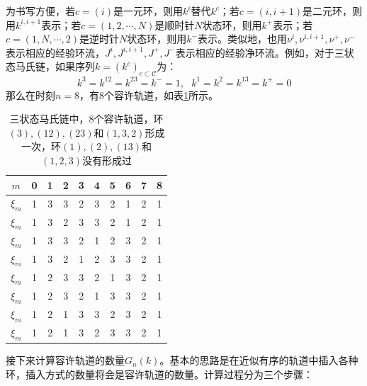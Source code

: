 为书写方便，若$c=(i)$是一元环，则用$k^i$替代$k^c$；若$c=(i,i+1)$是二元环，则用$k^{i,i+1}$表示；若$c=(1,2,\cdots,N)$是顺时针$N$状态环，则用$k^{+}$表示；若$c=(1,N,\cdots,2)$是逆时针$N$状态环，则用$k^{-}$表示。类似地，也用$\nu^i, \nu^{i,i+1}, \nu^+, \nu^-$表示相应的经验环流，$J^i, J^{i, i+1}, J^{+}, J^{-}$表示相应的经验净环流。例如，对于三状态马氏链，如果序列$k=(k^c)_{c\subset \mathcal{C}}$为：
\begin{equation} \label{trajectory_ex}
    k^3 = k^{12} = k^{23} = k^- = 1, ~~~ k^1 = k^2 = k^{13} = k^+= 0
\end{equation}
那么在时刻$n=8$，有8个容许轨道，如表\ref{table:all possible trajectories}所示。

\begin{table}[htb!]
    \renewcommand\arraystretch{0.8}
    \begin{tabular}{cccccccccc}
    \hline
   $m$   & 0 & 1 & 2 & 3 & 4 & 5 & 6 & 7 & 8 \\\hline
   $\xi_m$& 1 & 3 & 3 & 2 & 3 & 2 & 1 & 2 & 1 \\\hline
   $\xi_m$& 1 & 3 & 2 & 3 & 3 & 2 & 1 & 2 & 1 \\\hline
   $\xi_m$& 1 & 3 & 3 & 2 & 1 & 2 & 3 & 2 & 1 \\\hline
   $\xi_m$& 1 & 3 & 2 & 1 & 2 & 3 & 3 & 2 & 1 \\\hline
   $\xi_m$& 1 & 2 & 3 & 3 & 2 & 1 & 3 & 2 & 1 \\\hline
   $\xi_m$& 1 & 2 & 3 & 2 & 1 & 3 & 3 & 2 & 1 \\\hline
   $\xi_m$& 1 & 2 & 1 & 3 & 3 & 2 & 3 & 2 & 1 \\\hline
   $\xi_m$& 1 & 2 & 1 & 3 & 2 & 3 & 3 & 2 & 1 \\\hline
    \end{tabular}\centering
    \caption{三状态马氏链中，8个容许轨道，环$(3), (12), (23)$和$(1,3,2)$形成一次，环$(1), (2), (13)$和$(1,2,3)$没有形成过}
    \label{table:all possible trajectories}
\end{table}

接下来计算容许轨道的数量$G_n(k)$。基本的思路是在近似有序的轨道中插入各种环，插入方式的数量将会是容许轨道的数量。计算过程分为三个步骤：


